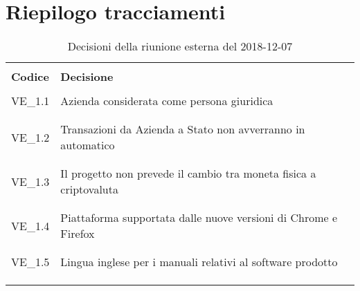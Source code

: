 \section{Riepilogo tracciamenti}
\begin{centering}
\begin{longtable}{ >{\centering}p{4cm} >{\centering}p{11cm} }

\hline
\\[0.5pt]
	\textbf{Codice} & \textbf{Decisione} 
	
	\tabularnewline 
	\hline
	
	
				\\[0.5pt]
				VE\_1.1 & Azienda considerata come persona giuridica
				\\[0.5pt]
				\tabularnewline
				\hline
						
				\\[0.5pt]
				VE\_1.2 & Transazioni da Azienda a Stato non avverranno in automatico
				\\[0.5pt]
				\tabularnewline
				\hline
				
				\\[0.5pt]
				VE\_1.3 & Il progetto non prevede il cambio tra moneta fisica a criptovaluta
				\\[0.5pt]
				\tabularnewline
				\hline
								
				\\[0.5pt]
				VE\_1.4 & Piattaforma supportata dalle nuove versioni di Chrome e Firefox
				\\[0.5pt]
				\tabularnewline
				\hline
				
				\\[0.5pt]
				VE\_1.5 & Lingua inglese per i manuali relativi al software prodotto
				\\[0.5pt]
				\tabularnewline
				\hline
				
                
        \\[0.7pt]
        \caption{Decisioni della riunione esterna del 2018-12-07}
\end{longtable}
\end{centering}

